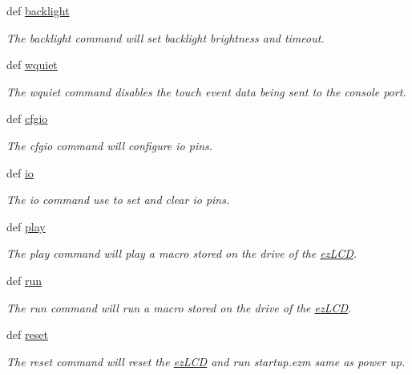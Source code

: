 \begin{DoxyCompactItemize}
def \hyperlink{group___general_gacecf5c1b5956caef4a4030f51bc4a809}{backlight}
\begin{DoxyCompactList}\small\item\em The backlight command will set backlight brightness and timeout. \end{DoxyCompactList}\item 
def \hyperlink{group___general_ga78b38855b8bcb0609d340a80210a0d0f}{wquiet}
\begin{DoxyCompactList}\small\item\em The wquiet command disables the touch event data being sent to the console port. \end{DoxyCompactList}\item 
def \hyperlink{group___general_ga38687b7d07bf93afe6891d3dca6205f4}{cfgio}
\begin{DoxyCompactList}\small\item\em The cfgio command will configure io pins. \end{DoxyCompactList}\item 
def \hyperlink{group___general_gaf87ad0b88f8a279c20666363bc7460b6}{io}
\begin{DoxyCompactList}\small\item\em The io command use to set and clear io pins. \end{DoxyCompactList}\item 
def \hyperlink{group___general_ga15f87f284189816d98ab5bf0b5a94a99}{play}
\begin{DoxyCompactList}\small\item\em The play command will play a macro stored on the drive of the \hyperlink{classez_l_c_d3xx_1_1ez_l_c_d}{ez\-L\-C\-D}. \end{DoxyCompactList}\item 
def \hyperlink{group___general_ga7faa11f7fbe4da6ba981a5b8c4cb37aa}{run}
\begin{DoxyCompactList}\small\item\em The run command will run a macro stored on the drive of the \hyperlink{classez_l_c_d3xx_1_1ez_l_c_d}{ez\-L\-C\-D}. \end{DoxyCompactList}\item 
def \hyperlink{group___general_gabc1cd3bb62dfa8a8f37f5da5cbb3e85c}{reset}
\begin{DoxyCompactList}\small\item\em The reset command will reset the \hyperlink{classez_l_c_d3xx_1_1ez_l_c_d}{ez\-L\-C\-D} and run startup.\-ezm same as power up. \end{DoxyCompactList}\item 

\end{DoxyCompactItemize}
